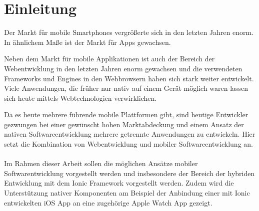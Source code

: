 \chapter{Einleitung}
%
Der Markt für mobile Smartphones vergrößerte sich in den letzten Jahren enorm. In ähnlichem Maße ist der Markt für Apps gewachsen. 

Neben dem Markt für mobile Applikationen ist auch der Bereich der Webentwicklung in den letzten Jahren enorm gewachsen und die verwendeten Frameworks und Engines in den Webbrowsern haben sich stark weiter entwickelt. Viele Anwendungen, die früher nur nativ auf einem Gerät möglich waren lassen sich heute mittels Webtechnologien verwirklichen.

Da es heute mehrere führende mobile Plattformen gibt, sind heutige Entwickler gezwungen bei einer gewünscht hohen Marktabdeckung und einem Ansatz der nativen Softwareentwicklung mehrere getrennte Anwendungen zu entwickeln. Hier setzt die Kombination von Webentwicklung und mobiler Softwareentwicklung an.
\\
\\
Im Rahmen dieser Arbeit sollen die möglichen Ansätze mobiler Softwarentwicklung vorgestellt werden und insbesondere der Bereich der hybriden Entwicklung mit dem Ionic Framework vorgestellt werden. Zudem wird die Unterstützung nativer Komponenten am Beispiel der Anbindung einer mit Ionic entwickelten iOS App an eine zugehörige Apple Watch App gezeigt.